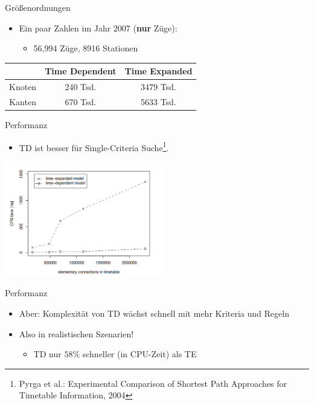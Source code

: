 \begin{frame}{Größenordnungen}
	\begin{itemize}
		\item Ein paar Zahlen im Jahr 2007 (\textbf{nur} Züge):
		\begin{itemize}
			\item 56,994 Züge, 8916 Stationen
		\end{itemize}
	\end{itemize}
	
	\begin{center}
		\begin{tabular}{ c||c|c } 
			& Time Dependent & Time Expanded \\
 			\hline
 			\hline
 			Knoten & 240 Tsd. & 3479 Tsd. \\
 			Kanten & 670 Tsd. & 5633 Tsd. \\
 			\hline
		\end{tabular}
	\end{center}
\end{frame}


\begin{frame}{Performanz}
	\begin{itemize}
		\item TD ist besser für Single-Criteria Suche\footnote{Pyrga et al.: Experimental Comparison of Shortest Path Approaches for Timetable Information, 2004}.
	\end{itemize}

		\begin{center}
		\includegraphics[height=5cm]{images/comparisons/comparison-simple.png} 
	\end{center}
\end{frame}


\begin{frame}{Performanz}
	\begin{itemize}
		\item Aber: Komplexität von TD wächst schnell mit mehr Kriteria und Regeln
		\item Also in realistischen Szenarien!
		\begin{itemize}
			\item TD nur $58\%$ schneller (in CPU-Zeit) als TE
		\end{itemize}
	\end{itemize}

\end{frame}

